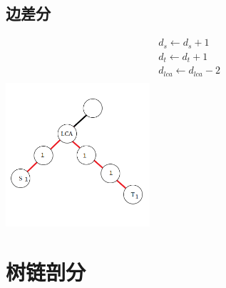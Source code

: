 \documentclass[a4paper]{book}
\begin{document}
\subsection{边差分}
$$
\begin{aligned}
    &d_s \leftarrow d_s+1\\
    &d_t \leftarrow d_t+1 \\
    &d_{lca} \leftarrow d_{lca}-2\\
\end{aligned}
$$
\includegraphics[width=0.4\textwidth,center]{../photo/prefix_sum2.png}
\section{树链剖分}
\end{document}
